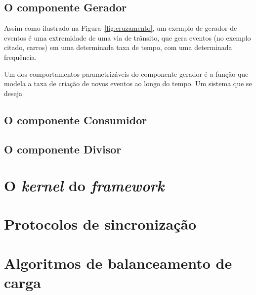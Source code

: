 \subsection{O componente Gerador}

Assim como ilustrado na Figura~\ref{fig:cruzamento}, um exemplo de gerador de eventos é uma extremidade de uma via de trânsito, que gera eventos (no exemplo citado, carros) em uma determinada taxa de tempo, com uma determinada frequência.

Um dos comportamentos parametrizáveis do componente gerador é a função que modela a taxa de criação de novos eventos ao longo do tempo. Um sistema que se deseja

\subsection{O componente Consumidor}
\subsection{O componente Divisor}

\section{O \textit{kernel} do \textit{framework}}


\section{Protocolos de sincronização}


\section{Algoritmos de balanceamento de carga}
